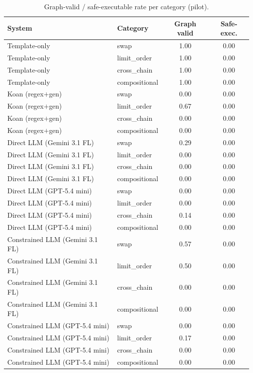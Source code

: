 \begin{table}[t]
\centering
\caption{Graph-valid / safe-executable rate per category (pilot).}
\label{tab:per-category}
\begin{tabular}{llcc}
\toprule
System & Category & Graph valid & Safe-exec. \\
\midrule
Template-only & swap & 1.00 & 0.00 \\
Template-only & limit\_order & 1.00 & 0.00 \\
Template-only & cross\_chain & 1.00 & 0.00 \\
Template-only & compositional & 1.00 & 0.00 \\
Koan (regex$+$gen) & swap & 0.00 & 0.00 \\
Koan (regex$+$gen) & limit\_order & 0.67 & 0.00 \\
Koan (regex$+$gen) & cross\_chain & 0.00 & 0.00 \\
Koan (regex$+$gen) & compositional & 0.00 & 0.00 \\
Direct LLM (Gemini 3.1 FL) & swap & 0.29 & 0.00 \\
Direct LLM (Gemini 3.1 FL) & limit\_order & 0.00 & 0.00 \\
Direct LLM (Gemini 3.1 FL) & cross\_chain & 0.00 & 0.00 \\
Direct LLM (Gemini 3.1 FL) & compositional & 0.00 & 0.00 \\
Direct LLM (GPT-5.4 mini) & swap & 0.00 & 0.00 \\
Direct LLM (GPT-5.4 mini) & limit\_order & 0.00 & 0.00 \\
Direct LLM (GPT-5.4 mini) & cross\_chain & 0.14 & 0.00 \\
Direct LLM (GPT-5.4 mini) & compositional & 0.00 & 0.00 \\
Constrained LLM (Gemini 3.1 FL) & swap & 0.57 & 0.00 \\
Constrained LLM (Gemini 3.1 FL) & limit\_order & 0.50 & 0.00 \\
Constrained LLM (Gemini 3.1 FL) & cross\_chain & 0.00 & 0.00 \\
Constrained LLM (Gemini 3.1 FL) & compositional & 0.00 & 0.00 \\
Constrained LLM (GPT-5.4 mini) & swap & 0.00 & 0.00 \\
Constrained LLM (GPT-5.4 mini) & limit\_order & 0.17 & 0.00 \\
Constrained LLM (GPT-5.4 mini) & cross\_chain & 0.00 & 0.00 \\
Constrained LLM (GPT-5.4 mini) & compositional & 0.00 & 0.00 \\
\bottomrule
\end{tabular}
\end{table}
